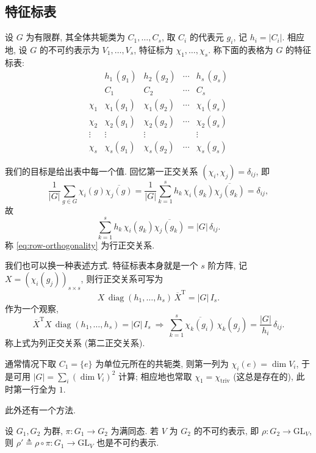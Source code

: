\subsection{特征标表}

\begin{definition}[特征标表]\label{def:character-table}
设 $G$ 为有限群, 其全体共轭类为 $C_1,\dots,C_s$, 取 $C_i$ 的代表元 $g_i$,
记 $h_i=|C_i|$. 相应地, 设 $G$ 的不可约表示为 $V_1,\dots,V_s$, 特征标为
$\chi_1,\dots,\chi_s$. 称下面的表格为 $G$ 的特征标表:
\[
\begin{array}{c|cccc}
  & h_1\,(g_1) & h_2\,(g_2) & \cdots & h_s\,(g_s)\\
  & C_1 & C_2 & \cdots & C_s\\ \hline
  \chi_1 & \chi_1(g_1) & \chi_1(g_2) & \cdots & \chi_1(g_s)\\
  \chi_2 & \chi_2(g_1) & \chi_2(g_2) & \cdots & \chi_2(g_s)\\
  \vdots & \vdots & \vdots & & \vdots\\
  \chi_s & \chi_s(g_1) & \chi_s(g_2) & \cdots & \chi_s(g_s)
\end{array}
\]
\end{definition}

我们的目标是给出表中每一个值. 回忆第一正交关系 $(\chi_i,\chi_j)=\delta_{ij}$, 即
\[
  \frac{1}{|G|}\sum_{g\in G}\chi_i(g)\overline{\chi_j(g)}
  =\frac{1}{|G|}\sum_{k=1}^{s}h_k\,\chi_i(g_k)\overline{\chi_j(g_k)}=\delta_{ij},
\]
故
\begin{equation}\label{eq:row-orthogonality}
  \sum_{k=1}^{s}h_k\,\chi_i(g_k)\overline{\chi_j(g_k)}=|G|\,\delta_{ij}.
\end{equation}
称 \eqref{eq:row-orthogonality} 为行正交关系.

我们也可以换一种表述方式. 特征标表本身就是一个 $s$ 阶方阵, 记
$X=(\chi_i(g_j))_{s\times s}$, 则行正交关系可写为
\[
  X\,\operatorname{diag}(h_1,\dots,h_s)\,\overline{X}^{\mathrm{T}}=|G|\,I_s .
\]
作为一个观察,
\[
  \overline{X}^{\mathrm{T}}X\,\operatorname{diag}(h_1,\dots,h_s)=|G|\,I_s
  \ \Longrightarrow\
  \sum_{k=1}^{s}\overline{\chi_k(g_i)}\,\chi_k(g_j)=\frac{|G|}{h_i}\,\delta_{ij}.
\]
称上式为列正交关系 (第二正交关系).

通常情况下取 $C_1=\{e\}$ 为单位元所在的共轭类, 则第一列为
$\chi_i(e)=\dim V_i$, 于是可用 $|G|=\sum_i(\dim V_i)^2$ 计算; 相应地也常取
$\chi_1=\chi_{\mathrm{triv}}$ (这总是存在的), 此时第一行全为 $1$.

此外还有一个方法.

\begin{proposition}\label{prop:quotient-irreducible}
设 $G_1,G_2$ 为群, $\pi\colon G_1\to G_2$ 为满同态. 若 $V$ 为 $G_2$ 的不可约表示,
即 $\rho\colon G_2\to\mathrm{GL}_V$, 则 $\rho'\triangleq\rho\circ\pi\colon G_1\to\mathrm{GL}_V$
也是不可约表示.
\end{proposition}

